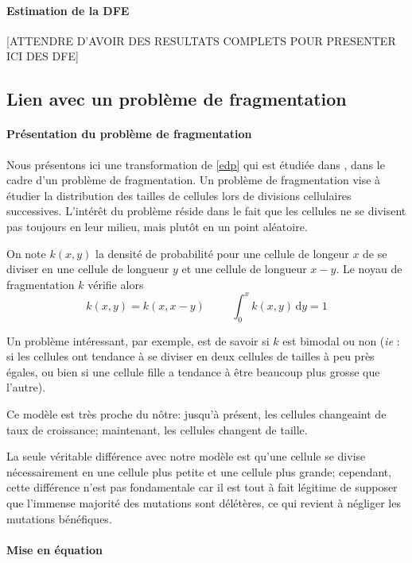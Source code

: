 \documentclass[12pt]{article}
\newcommand{\esp}{\hspace{1cm}}
\newcommand{\ie}{\emph{ie} }
\newcommand{\de}{\,\mathrm{d}}
\begin{document}
\paragraph{Estimation de la DFE}

[ATTENDRE D'AVOIR DES RESULTATS COMPLETS POUR PRESENTER ICI DES DFE]

\subsection{Lien avec un problème de fragmentation}

\paragraph{Présentation du problème de fragmentation}
Nous présentons ici une transformation de \eqref{edp} qui est étudiée dans \cite{md1}, \cite{md2} dans le cadre d'un problème de fragmentation. Un problème de fragmentation vise à étudier la distribution des tailles de cellules lors de divisions cellulaires successives. L'intérêt du problème réside dans le fait que les cellules ne se divisent pas toujours en leur milieu, mais plutôt en un point aléatoire.

On note $k(x,y)$ la densité de probabilité pour une cellule de longeur $x$ de se diviser en une cellule de longueur $y$ et une cellule de longueur $x-y$. Le noyau de fragmentation $k$ vérifie alors \[k(x,y)=k(x,x-y)\esp \int_0^xk(x,y)\de y=1\]

Un problème intéressant, par exemple, est de savoir si $k$ est bimodal ou non (\ie: si les cellules ont tendance à se diviser en deux cellules de tailles à peu près égales, ou bien si une cellule fille a tendance à être beaucoup plus grosse que l'autre).

Ce modèle est très proche du nôtre: jusqu'à présent, les cellules changeaint de taux de croissance; maintenant, les cellules changent de taille.

La seule véritable différence avec notre modèle est qu'une cellule se divise nécessairement en une cellule plus petite et une cellule plus grande; cependant, cette différence n'est pas fondamentale car il est tout à fait légitime de supposer que l'immense majorité des mutations sont délétères, ce qui revient à négliger les mutations bénéfiques.

\paragraph{Mise en équation} 
\end{document}
